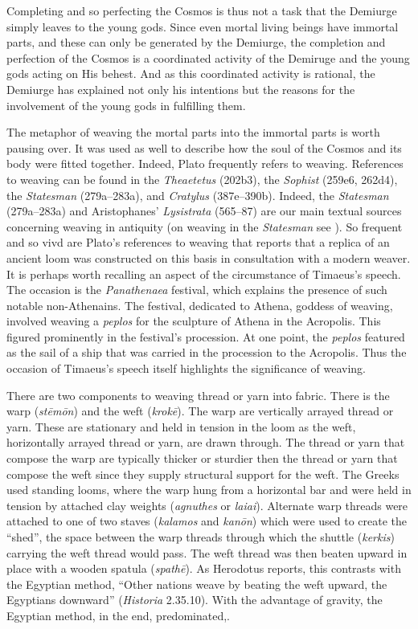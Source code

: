 Completing and so perfecting the Cosmos is thus not a task that the Demiurge simply leaves to the young gods. Since even mortal living beings have immortal parts, and these can only be generated by the Demiurge, the completion and perfection of the Cosmos is a coordinated activity of the Demiruge and the young gods acting on His behest. And as this coordinated activity is rational, the Demiurge has explained not only his intentions but the reasons for the involvement of the young gods in fulfilling them.

The metaphor of weaving the mortal parts into the immortal parts is worth pausing over. It was used as well to describe how the soul of the Cosmos and its body were fitted together. Indeed, Plato frequently refers to weaving. References to weaving can be found in the \emph{Theaetetus} (202b3), the \emph{Sophist} (259e6, 262d4), the \emph{Statesman} (279a--283a), and \emph{Cratylus} (387e--390b). Indeed, the \emph{Statesman} (279a--283a) and Aristophanes' \emph{Lysistrata} (565--87) are our main textual sources concerning weaving in antiquity (on weaving in the \emph{Statesman} see \citealt{Cole:1991qq}). So frequent and so vivd are Plato's references to weaving that \citet[44, n1]{Skemp:1952aa} reports that a replica of an ancient loom was constructed on this basis in consultation with a modern weaver. It is perhaps worth recalling an aspect of the circumstance of Timaeus's speech. The occasion is the \emph{Panathenaea} festival, which explains the presence of such notable non-Athenains. The festival, dedicated to Athena, goddess of weaving, involved weaving a \emph{peplos} for the sculpture of Athena in the Acropolis. This figured prominently in the festival's procession. At one point, the \emph{peplos} featured as the sail of a ship that was carried in the procession to the Acropolis. Thus the occasion of Timaeus's speech itself highlights the significance of weaving. 

There are two components to weaving thread or yarn into fabric. There is the warp (\emph{stēmōn}) and the weft (\emph{krokē}). The warp are vertically arrayed thread or yarn. These are stationary and held in tension in the loom as the weft, horizontally arrayed thread or yarn, are drawn through. The thread or yarn that compose the warp are typically thicker or sturdier then the thread or yarn that compose the weft since they supply structural support for the weft. The Greeks used standing looms, where the warp hung from a horizontal bar and were held in tension by attached clay weights (\emph{agnuthes} or \emph{laiai}). Alternate warp threads were attached to one of two staves (\emph{kalamos} and \emph{kanōn}) which were used to create the ``shed'', the space between the warp threads through which the shuttle (\emph{kerkis}) carrying the weft thread would pass. The weft thread was then beaten upward in place with a wooden spatula (\emph{spathē}). As Herodotus reports, this contrasts with the Egyptian method, ``Other nations weave by beating the weft upward, the Egyptians downward'' (\emph{Historia} 2.35.10). With the advantage of gravity, the Egyptian method, in the end, predominated,.

